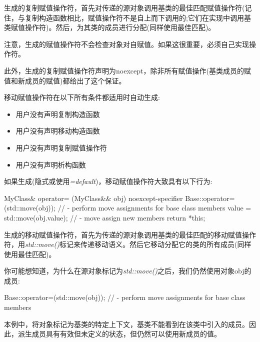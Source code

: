 生成的复制赋值操作符，首先对传递的源对象调用基类的最佳匹配赋值操作符(记住，与复制构造函数相比，赋值操作符不是自上而下调用的;它们在实现中调用基类赋值操作符)。然后，为其类的成员进行分配(同样使用最佳匹配)。\par

注意，生成的赋值操作符不会检查对象对自赋值。如果这很重要，必须自己实现操作符。\par

此外，生成的复制赋值操作符声明为noexcept，除非所有赋值操作(基类成员的赋值和新成员的赋值)都给出了这个保证。\par


移动赋值操作符在以下所有条件都适用时自动生成:\par

\begin{itemize}
  \item 用户没有声明复制构造函数
  \item 用户没有声明移动构造函数
  \item 用户没有声明复制赋值操作符
  \item 用户没有声明析构函数
\end{itemize}

如果生成(隐式或使用\textit{=default})，移动赋值操作符大致具有以下行为:\par

\begin{codebox}[cpp]
MyClass& operator= (MyClass&& obj) noexcept-specifier {
  Base::operator=(std::move(obj)); // - perform move assignments for base class members
  value = std::move(obj.value); // - move assign new members
  return *this;
}
\end{codebox}

生成的移动赋值操作符，首先为传递的源对象调用基类的最佳匹配的移动赋值操作符，用\textit{std::move()}标记来传递移动语义。然后它移动分配它的类的所有成员(同样使用最佳匹配)。\par

你可能想知道，为什么在源对象标记为\textit{std::move()}之后，我们仍然使用对象obj的成员:\par

\begin{codebox}[cpp]
Base::operator=(std::move(obj)); // - perform move assignments for base class members
\end{codebox}

本例中，将对象标记为基类的特定上下文，基类不能看到在该类中引入的成员。因此，派生成员具有有效但未定义的状态，但仍然可以使用新成员的值。\par

